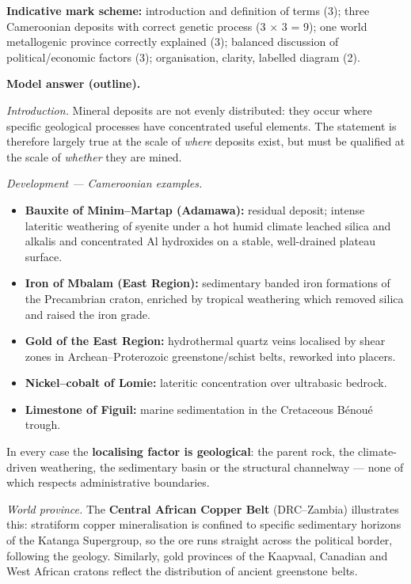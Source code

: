 \documentclass[11pt]{article}
\begin{document}
\begin{corrige}
\textbf{Indicative mark scheme:} introduction and definition of terms (3); three Cameroonian deposits with correct genetic process (3 $\times$ 3 = 9); one world metallogenic province correctly explained (3); balanced discussion of political/economic factors (3); organisation, clarity, labelled diagram (2).

\textbf{Model answer (outline).}

\emph{Introduction.} Mineral deposits are not evenly distributed: they occur where specific geological processes have concentrated useful elements. The statement is therefore largely true at the scale of \emph{where} deposits exist, but must be qualified at the scale of \emph{whether} they are mined.

\emph{Development — Cameroonian examples.}
\begin{itemize}
\item \textbf{Bauxite of Minim--Martap (Adamawa):} residual deposit; intense lateritic weathering of syenite under a hot humid climate leached silica and alkalis and concentrated Al hydroxides on a stable, well-drained plateau surface.
\item \textbf{Iron of Mbalam (East Region):} sedimentary banded iron formations of the Precambrian craton, enriched by tropical weathering which removed silica and raised the iron grade.
\item \textbf{Gold of the East Region:} hydrothermal quartz veins localised by shear zones in Archean--Proterozoic greenstone/schist belts, reworked into placers.
\item \textbf{Nickel--cobalt of Lomie:} lateritic concentration over ultrabasic bedrock.
\item \textbf{Limestone of Figuil:} marine sedimentation in the Cretaceous B\'enou\'e trough.
\end{itemize}
In every case the \textbf{localising factor is geological}: the parent rock, the climate-driven weathering, the sedimentary basin or the structural channelway — none of which respects administrative boundaries.

\emph{World province.} The \textbf{Central African Copper Belt} (DRC--Zambia) illustrates this: stratiform copper mineralisation is confined to specific sedimentary horizons of the Katanga Supergroup, so the ore runs straight across the political border, following the geology. Similarly, gold provinces of the Kaapvaal, Canadian and West African cratons reflect the distribution of ancient greenstone belts.


\end{corrige}
\end{document}
